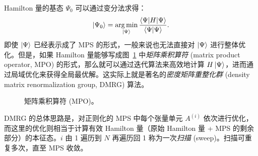 Hamilton 量的基态 $\Psi_0$ 可以通过变分法求得：
\begin{equation}
  \ket{\Psi_0} = \argmin_{\ket{\Psi}} \frac{\langle\Psi|H|\Psi\rangle}{\langle\Psi|\Psi\rangle}.
\end{equation}
即使 $\ket{\Psi}$ 已经表示成了 MPS 的形式，一般来说也无法直接对 $\ket{\Psi}$ 进行整体优化。但是，如果 Hamilton 量能够写成图~\ref{fig:mpo} 中\emph{矩阵乘积算符} (matrix product operator, MPO) 的形式，那么就可以通过迭代算法来高效地计算 $H\ket{\Psi}$，进而通过局域优化来获得全局最优解。这实际上就是著名的\emph{密度矩阵重整化群} (density matrix renormalization group, DMRG) 算法\cite{white1992density,white1993density,schollwock2005density,mcculloch2007density,mcculloch2008infinite,schollwock2011density}。

\begin{figure}[htb]
  \centering
  \caption[矩阵乘积算符]{矩阵乘积算符 (MPO)。}
  \label{fig:mpo}
\end{figure}

DMRG 的总体思路是，对正则化的 MPS 中每个张量单元 $A^{(i)}$ 依次进行优化，而这里的优化则相当于计算有效 Hamilton 量（原始 Hamilton 量 + MPS 的剩余部分）的本征态。$i$ 由 1 遍历到 $N$ 再遍历回 1 称为一次\emph{扫描} (sweep)。扫描可重复多次，直至 MPS 收敛。

